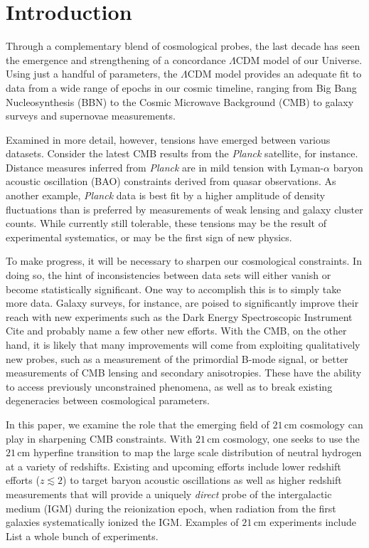 \documentclass[twocolumn,aps,prd,nofootinbib,showpacs]{revtex4-1}
\begin{document}
\maketitle

\section{Introduction}
Through a complementary blend of cosmological probes, the last decade has seen the emergence and strengthening of a concordance $\Lambda$CDM model of our Universe. Using just a handful of parameters, the $\Lambda$CDM model provides an adequate fit to data from a wide range of epochs in our cosmic timeline, ranging from Big Bang Nucleosynthesis (BBN) to the Cosmic Microwave Background (CMB) to galaxy surveys and supernovae measurements.

Examined in more detail, however, tensions have emerged between various datasets. Consider the latest CMB results from the \emph{Planck} satellite, for instance. Distance measures inferred from \emph{Planck} are in mild tension with Lyman-$\alpha$ baryon acoustic oscillation (BAO) constraints derived from quasar observations. As another example, \emph{Planck} data is best fit by a higher amplitude of density fluctuations than is preferred by measurements of weak lensing and galaxy cluster counts. While currently still tolerable, these tensions may be the result of experimental systematics, or may be the first sign of new physics. 

To make progress, it will be necessary to sharpen our cosmological constraints. In doing so, the hint of inconsistencies between data sets will either vanish or become statistically significant. One way to accomplish this is to simply take more data. Galaxy surveys, for instance, are poised to significantly improve their reach with new experiments such as the Dark Energy Spectroscopic Instrument \acl{Cite and probably name a few other new efforts}. With the CMB, on the other hand, it is likely that many improvements will come from exploiting qualitatively new probes, such as a measurement of the primordial B-mode signal, or better measurements of CMB lensing and secondary anisotropies. These have the ability to access previously unconstrained phenomena, as well as to break existing degeneracies between cosmological parameters.

In this paper, we examine the role that the emerging field of $21\,\textrm{cm}$ cosmology can play in sharpening CMB constraints. With $21\,\textrm{cm}$ cosmology, one seeks to use the $21\,\textrm{cm}$ hyperfine transition to map the large scale distribution of neutral hydrogen at a variety of redshifts. Existing and upcoming efforts include lower redshift efforts ($z \lesssim 2$) to target baryon acoustic oscillations as well as higher redshift measurements that will provide a uniquely \emph{direct} probe of the intergalactic medium (IGM) during the reionization epoch, when radiation from the first galaxies systematically ionized the IGM. Examples of $21\,\textrm{cm}$ experiments include \acl{List a whole bunch of experiments}.
\end{document}
